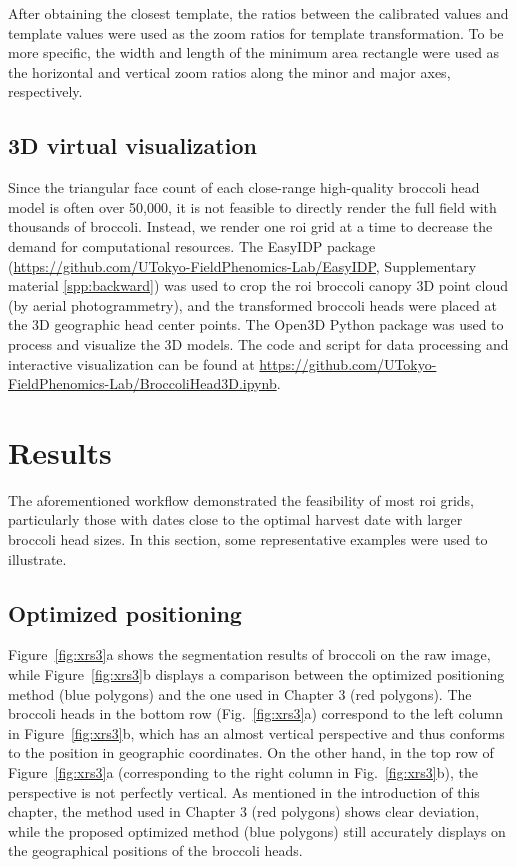 After obtaining the closest template, the ratios between the calibrated values and template values were used as the zoom ratios for template transformation. To be more specific, the width and length of the minimum area rectangle were used as the horizontal and vertical zoom ratios along the minor and major axes, respectively.

\subsection{3D virtual visualization}

Since the triangular face count of each close-range high-quality broccoli head model is often over 50,000, it is not feasible to directly render the full field with thousands of broccoli. Instead, we render one \gls{roi} grid at a time to decrease the demand for computational resources. The EasyIDP package (\url{https://github.com/UTokyo-FieldPhenomics-Lab/EasyIDP}, Supplementary material \ref{spp:backward}) was used to crop the \gls{roi} broccoli canopy 3D point cloud (by aerial photogrammetry), and the transformed broccoli heads were placed at the 3D geographic head center points. The Open3D Python package \citep[\url{https://github.com/isl-org/Open3D}]{zhou_open3d_2018} was used to process and visualize the 3D models. The code and script for data processing and interactive visualization can be found at \url{https://github.com/UTokyo-FieldPhenomics-Lab/BroccoliHead3D.ipynb}.

\section{Results}

The aforementioned workflow demonstrated the feasibility of most \gls{roi} grids, particularly those with dates close to the optimal harvest date with larger broccoli head sizes. In this section, some representative examples were used to illustrate.

\subsection{Optimized positioning}

Figure~\ref{fig:xrs3}a shows the segmentation results of broccoli on the raw image, while Figure~\ref{fig:xrs3}b displays a comparison between the optimized positioning method (blue polygons) and the one used in Chapter 3 (red polygons). The broccoli heads in the bottom row (Fig.~\ref{fig:xrs3}a) correspond to the left column in Figure~\ref{fig:xrs3}b, which has an almost vertical perspective and thus conforms to the position in geographic coordinates. On the other hand, in the top row of Figure~\ref{fig:xrs3}a (corresponding to the right column in Fig.~\ref{fig:xrs3}b), the perspective is not perfectly vertical. As mentioned in the introduction of this chapter, the method used in Chapter 3 (red polygons) shows clear deviation, while the proposed optimized method (blue polygons) still accurately displays on the geographical positions of the broccoli heads.

